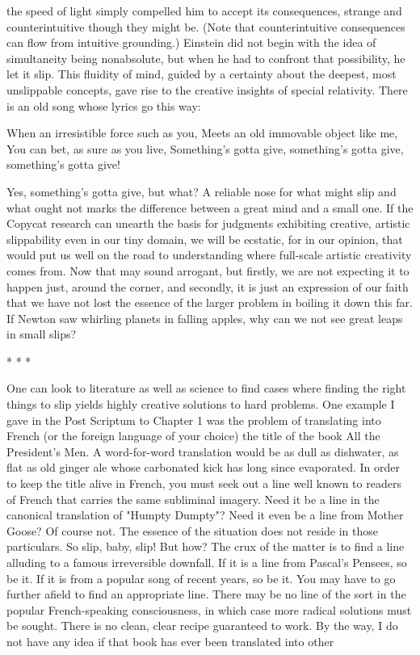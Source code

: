 the speed of light simply compelled him to accept its consequences, strange and
counterintuitive though they might be. (Note that counterintuitive consequences can
flow from intuitive grounding.) Einstein did not begin with the idea of simultaneity
being nonabsolute, but when he had to confront that possibility, he let it slip. This
fluidity of mind, guided by a certainty about the deepest, most unslippable concepts,
gave rise to the creative insights of special relativity.
        There is an old song whose lyrics go this way:

               When an irresistible force such as you,
               Meets an old immovable object like me,
               You can bet, as sure as you live,
               Something's gotta give, something's gotta give, something's gotta give!

Yes, something's gotta give, but what? A reliable nose for what might slip and what
ought not marks the difference between a great mind and a small one. If the Copycat
research can unearth the basis for judgments exhibiting creative, artistic slippability
even in our tiny domain, we will be ecstatic, for in our opinion, that would put us well
on the road to understanding where full-scale artistic creativity comes from. Now that
may sound arrogant, but firstly, we are not expecting it to happen just, around the
corner, and secondly, it is just an expression of our faith that we have not lost the
essence of the larger problem in boiling it down this far. If Newton saw whirling
planets in falling apples, why can we not see great leaps in small slips?

*   *   *

        One can look to literature as well as science to find cases where finding the
right things to slip yields highly creative solutions to hard problems. One example I
gave in the Post Scriptum to Chapter 1 was the problem of translating into French (or
the foreign language of your choice) the title of the book All the President's Men. A
word-for-word translation would be as dull as dishwater, as flat as old ginger ale
whose carbonated kick has long since evaporated. In order to keep the title alive in
French, you must seek out a line well known to readers of French that carries the
same subliminal imagery. Need it be a line in the canonical translation of "Humpty
Dumpty"? Need it even be a line from Mother Goose? Of course not. The essence of
the situation does not reside in those particulars. So slip, baby, slip! But how?
        The crux of the matter is to find a line alluding to a famous irreversible
downfall. If it is a line from Pascal's Pensees, so be it. If it is from a popular song of
recent years, so be it. You may have to go further afield to find an appropriate line.
There may be no line of the sort in the popular French-speaking consciousness, in
which case more radical solutions must be sought. There is no clean, clear recipe
guaranteed to work. By the way, I do not have any idea if that book has ever been
translated into other





